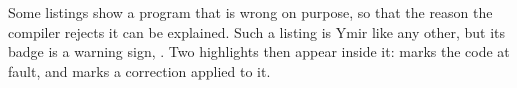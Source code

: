 Some listings show a program that is wrong on purpose, so that the reason the
compiler rejects it can be explained. Such a listing is Ymir like any other, but
its badge is a warning sign, \ymirbadgeerror. Two highlights then appear inside
it:  marks the code at fault, and  marks a correction applied
to it.

\vfill%
\pagebreak%
